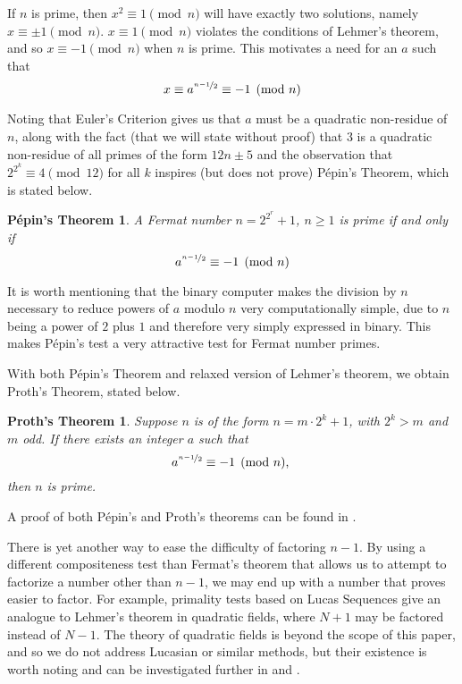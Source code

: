 \documentclass{article}
\begin{document}
If $n$ is prime, then $x^2 \equiv 1 \pmod n$ will have exactly two solutions, namely $x \equiv \pm 1 \pmod n$. $x \equiv 1 \pmod n$ violates the conditions of Lehmer's theorem, and so $x \equiv -1 \pmod n$ when $n$ is prime. This motivates a need for an $a$ such that 
	$$x \equiv a^{\nicefrac{n - 1}{2}} \equiv -1 \pmod n$$
	
\par Noting that Euler's Criterion gives us that $a$ must be a quadratic non-residue of $n$, along with the fact (that we will state without proof) that $3$ is a quadratic non-residue of all primes of the form $12n \pm 5$ and the observation that $2^{2^k} \equiv 4 \pmod {12}$ for all $k$ inspires (but does not prove) P\'{e}pin's Theorem, which is stated below.

\newtheorem*{pepin}{P\'{e}pin's Theorem}
\begin{pepin}
A Fermat number $n = 2^{2^r} + 1$, $n \geq 1$ is prime if and only if 
	$$ a^{\nicefrac{n - 1}{2}} \equiv  - 1 \pmod n$$
\end{pepin}

It is worth mentioning that the binary computer makes the division by $n$ necessary to reduce powers of $a$ modulo $n$ very computationally simple, due to $n$ being a power of $2$ plus $1$ and therefore very simply expressed in binary. This makes P\'{e}pin's test a very attractive test for Fermat number primes. 

With both  P\'{e}pin's Theorem and relaxed version of Lehmer's theorem, we obtain Proth's Theorem, stated below.

\newtheorem*{proth}{Proth's Theorem}
\begin{proth}
Suppose $n$ is of the form $n = m \cdot 2^k + 1$, with $2^k > m$ and $m$ odd. If there exists an integer $a$ such that 
	$$a^{\nicefrac{n-1}{2}} \equiv -1 \pmod n \text{, }$$
then $n$ is prime.
\end{proth}
A proof of both P\'{e}pin's and Proth's theorems can be found in \citep{yale}. \\
\par There is yet another way to ease the difficulty of factoring $n - 1$. By using a different compositeness test than Fermat's theorem that allows us to attempt to factorize a number other than $n - 1$, we may end up with a number that proves easier to factor. For example, primality tests based on Lucas Sequences give an analogue to Lehmer's theorem in quadratic fields, where $N+1$ may be factored instead of $N-1$. The theory of quadratic fields is beyond the scope of this paper, and so we do not address Lucasian or similar methods, but their existence is worth noting and can be investigated further in \citep{riesel} and \citep{yale}.
\end{document}
